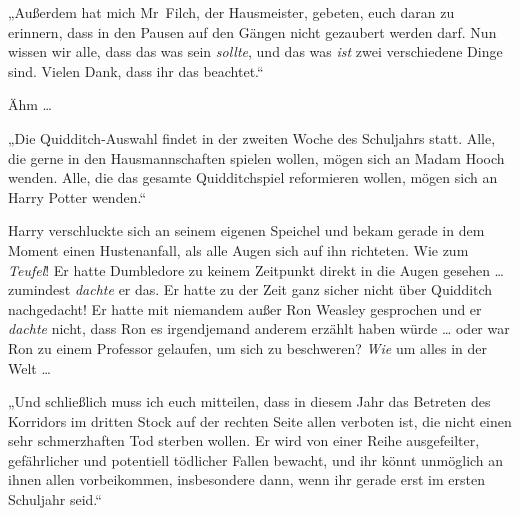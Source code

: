 „Außerdem hat mich Mr~Filch, der Hausmeister, gebeten, euch daran zu erinnern, dass in den Pausen auf den Gängen nicht gezaubert werden darf. Nun wissen wir alle, dass das was sein \emph{sollte}, und das was \emph{ist} zwei verschiedene Dinge sind. Vielen Dank, dass ihr das beachtet.“


Ähm …

„Die Quidditch-Auswahl findet in der zweiten Woche des Schuljahrs statt. Alle, die gerne in den Hausmannschaften spielen wollen, mögen sich an Madam Hooch wenden. Alle, die das gesamte Quidditchspiel reformieren wollen, mögen sich an Harry Potter wenden.“

Harry verschluckte sich an seinem eigenen Speichel und bekam gerade in dem Moment einen Hustenanfall, als alle Augen sich auf ihn richteten. Wie zum \emph{Teufel}! Er hatte Dumbledore zu keinem Zeitpunkt direkt in die Augen gesehen … zumindest \emph{dachte} er das. Er hatte zu der Zeit ganz sicher nicht über Quidditch nachgedacht! Er hatte mit niemandem außer Ron Weasley gesprochen und er \emph{dachte} nicht, dass Ron es irgendjemand anderem erzählt haben würde … oder war Ron zu einem Professor gelaufen, um sich zu beschweren? \emph{Wie} um alles in der Welt …

„Und schließlich muss ich euch mitteilen, dass in diesem Jahr das Betreten des Korridors im dritten Stock auf der rechten Seite allen verboten ist, die nicht einen sehr schmerzhaften Tod sterben wollen. Er wird von einer Reihe ausgefeilter, gefährlicher und potentiell tödlicher Fallen bewacht, und ihr könnt unmöglich an ihnen allen vorbeikommen, insbesondere dann, wenn ihr gerade erst im ersten Schuljahr seid.“

